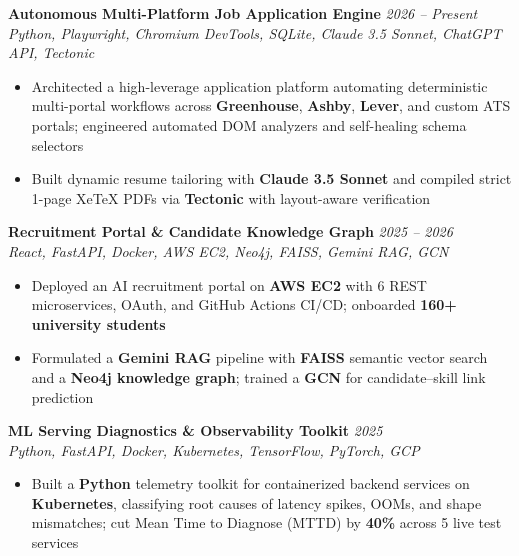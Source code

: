 \documentclass[10pt]{article}
\begin{document}
\textbf{Autonomous Multi-Platform Job Application Engine} \hfill \href{https://github.com/username/project}{\faGithub} \textcolor{subheadingcolor}{\textit{2026 -- Present}} \\
\textit{Python, Playwright, Chromium DevTools, SQLite, Claude 3.5 Sonnet, ChatGPT API, Tectonic}
\begin{itemize}
    \item Architected a high-leverage application platform automating deterministic multi-portal workflows across \textbf{Greenhouse}, \textbf{Ashby}, \textbf{Lever}, and custom ATS portals; engineered automated DOM analyzers and self-healing schema selectors
    \item Built dynamic resume tailoring with \textbf{Claude 3.5 Sonnet} and compiled strict 1-page XeTeX PDFs via \textbf{Tectonic} with layout-aware verification
\end{itemize}
\vspace{-0.25em}

\textbf{Recruitment Portal \& Candidate Knowledge Graph} \hfill \href{https://github.com/username/portal}{\faGithub} \textcolor{subheadingcolor}{\textit{2025 -- 2026}} \\
\textit{React, FastAPI, Docker, AWS EC2, Neo4j, FAISS, Gemini RAG, GCN}
\begin{itemize}
    \item Deployed an AI recruitment portal on \textbf{AWS EC2} with 6 REST microservices, OAuth, and GitHub Actions CI/CD; onboarded \textbf{160+ university students}
    \item Formulated a \textbf{Gemini RAG} pipeline with \textbf{FAISS} semantic vector search and a \textbf{Neo4j knowledge graph}; trained a \textbf{GCN} for candidate--skill link prediction
\end{itemize}
\vspace{-0.25em}

\textbf{ML Serving Diagnostics \& Observability Toolkit} \hfill \href{https://github.com/username/ml-monitoring}{\faGithub} \textcolor{subheadingcolor}{\textit{2025}} \\
\textit{Python, FastAPI, Docker, Kubernetes, TensorFlow, PyTorch, GCP}
\begin{itemize}
    \item Built a \textbf{Python} telemetry toolkit for containerized backend services on \textbf{Kubernetes}, classifying root causes of latency spikes, OOMs, and shape mismatches; cut Mean Time to Diagnose (MTTD) by \textbf{40\%} across 5 live test services
\end{itemize}
\vspace{-0.45em}
\end{document}
